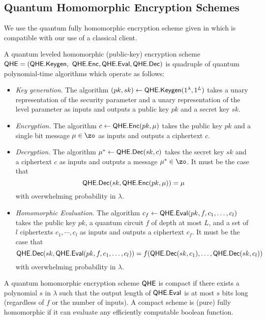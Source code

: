 \fi

\subsection{Quantum Homomorphic Encryption Schemes}

We use the quantum fully homomorphic encryption scheme given in \cite{mahadev_qfhe} which is compatible with our use of a classical client.
\begin{definition}
    A quantum leveled homomorphic (public-key) encryption scheme $\mathsf{QHE}=(\mathsf{QHE.Keygen},$ \linebreak
    $\mathsf{QHE.Enc}, \mathsf{QHE.Eval}, \mathsf{QHE.Dec})$ is quadruple of quantum polynomial-time algorithms which operate as follows:
    \begin{itemize}
        \item \emph{Key generation.}
            The algorithm $(pk, sk)\leftarrow\mathsf{QHE.Keygen}(1^\lambda, 1^L)$ takes a unary representation of the security parameter and a unary representation of the level parameter as inputs and outputs a public key $pk$ and a secret key $sk$.
        \item \emph{Encryption.}
            The algorithm $c\leftarrow\mathsf{QHE.Enc}(pk, \mu)$ takes the public key $pk$ and a single bit message $\mu\in\zo$ as inputs and outputs a ciphertext $c$.
        \item \emph{Decryption.}
            The algorithm $\mu^*\leftarrow\mathsf{QHE.Dec}(sk, c)$ takes the secret key $sk$ and a ciphertext $c$ as inputs and outputs a message $\mu^*\in\zo$.
            It must be the case that
                $$\mathsf{QHE.Dec}(sk, \mathsf{QHE.Enc}(pk, \mu))=\mu$$
            with overwhelming probability in $\lambda$.
        \item \emph{Homomorphic Evaluation.}
            The algorithm $c_f\leftarrow\mathsf{QHE.Eval}(pk, f, c_1, \ldots, c_l)$ takes the public key $pk$, a quantum circuit $f$ of depth at most $L$, and a set of $l$ ciphertexts $c_1,\cdots,c_l$ as inputs and outputs a ciphertext $c_f$.
            It must be the case that
                $$\mathsf{QHE.Dec}(sk, \mathsf{QHE.Eval}(pk, f, c_1, \ldots, c_l))=f(\mathsf{QHE.Dec}(sk, c_1),\ldots,\mathsf{QHE.Dec}(sk, c_l))$$
            with overwhelming probability in $\lambda$.
    \end{itemize}
\end{definition}

\begin{definition}
    A quantum homomorphic encryption scheme $\mathsf{QHE}$ is compact if
    there exists a polynomial $s$ in $\lambda$ such that the output length of $\mathsf{QHE.Eval}$ is at most $s$ bits long (regardless of $f$ or
    the number of inputs). A compact scheme is (pure) fully homomorphic if it can evaluate any efficiently computable
    boolean function.
\end{definition}


